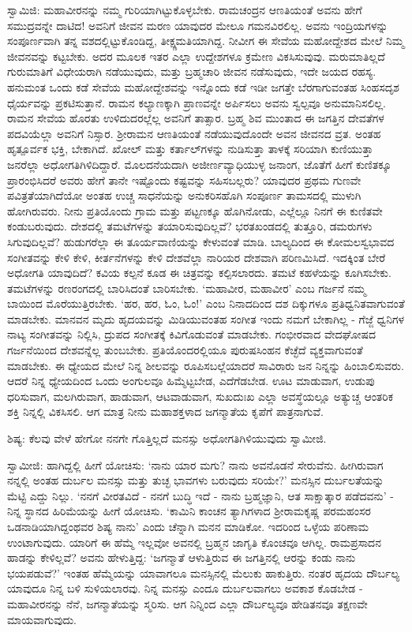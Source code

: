 ಸ್ವಾಮಿಜಿ: ಮಹಾವೀರನನ್ನು ನಮ್ಮ ಗುರಿಯಾಗಿಟ್ಟುಕೊಳ್ಳಬೇಕು. ರಾಮಚಂದ್ರನ ಆಣತಿಯಂತೆ ಅವನು ಹೇಗೆ ಸಮುದ್ರವನ್ನೇ ದಾಟಿದ! ಅವನಿಗೆ ಜೀವನ ಮರಣ ಯಾವುದರ ಮೇಲೂ ಗಮನವಿರಲಿಲ್ಲ. ಅವನು ಇಂದ್ರಿಯಗಳನ್ನು ಸಂಪೂರ್ಣವಾಗಿ ತನ್ನ ವಶದಲ್ಲಿಟ್ಟುಕೊಂಡಿದ್ದ, ತೀಕ್ಷ್ಣಮತಿಯಾಗಿದ್ದ. ನೀವೀಗ ಈ ಸೇವೆಯ ಮಹೋದ್ದೇಶದ ಮೇಲೆ ನಿಮ್ಮ ಜೀವನವನ್ನು ಕಟ್ಟಬೇಕು. ಅದರ ಮೂಲಕ ಇತರ ಎಲ್ಲಾ ಉದ್ದೇಶಗಳೂ ಕ್ರಮೇಣ ವಿಕಸಿಸುವುವು. ಮರುಮಾತಿಲ್ಲದೆ ಗುರುಮಾತಿಗೆ ವಿಧೇಯರಾಗಿ ನಡೆಯುವುದು, ಮತ್ತು ಬ್ರಹ್ಮಚಾರಿ ಜೀವನ ನಡೆಸುವುದು, ಇದೇ ಜಯದ ರಹಸ್ಯ. ಹನುಮಂತ ಒಂದು ಕಡೆ ಸೇವೆಯ ಮಹೋದ್ದೇಶವನ್ನು ಇನ್ನೊಂದು ಕಡೆ ಇಡೀ ಜಗತ್ತೇ ಬೆರಗಾಗುವಂತಹ ಸಿಂಹಸದೃಶ ಧೈರ್ಯವನ್ನು ಪ್ರಕಟಿಸುತ್ತಾನೆ. ರಾಮನ ಕಲ್ಯಾಣಕ್ಕಾಗಿ ಪ್ರಾಣವನ್ನೇ ಅರ್ಪಿಸಲು ಅವನು ಸ್ವಲ್ಪವೂ ಅನುಮಾನಿಸಲಿಲ್ಲ. ರಾಮನ ಸೇವೆಯ ಹೊರತು ಉಳಿದುದರಲ್ಲೆಲ್ಲ ಅವನಿಗೆ ತಾತ್ಸಾರ. ಬ್ರಹ್ಮ ಶಿವ ಮುಂತಾದ ಈ ಜಗತ್ತಿನ ದೇವತೆಗಳ ಪದವಿಯೆಲ್ಲಾ ಅವನಿಗೆ ನಿಸ್ಸಾರ. ಶ‍್ರೀರಾಮನ ಆಣತಿಯಂತೆ ನಡೆಯುವುದೊಂದೇ ಅವನ ಜೀವನದ ವ್ರತ. ಅಂತಹ ಹೃತ್ಪೂರ್ವಕ ಭಕ್ತಿ, ಬೇಕಾಗಿದೆ. ಖೋಲ್ ಮತ್ತು ಕರ್ತಾಲ್‌ಗಳನ್ನು ನುಡಿಸುತ್ತಾ ತಾಳಕ್ಕೆ ಸರಿಯಾಗಿ ಕುಣಿಯುತ್ತಾ ಜನರೆಲ್ಲಾ ಅಧೋಗತಿಗಿಳಿದಿದ್ದಾರೆ. ಮೊಲದನೆಯದಾಗಿ ಅಜೀರ್ಣವ್ಯಾಧಿಯುಳ್ಳ ಜನಾಂಗ, ಜೊತೆಗೆ ಹೀಗೆ ಕುಣಿತಕ್ಕೂ ಪ್ರಾರಂಭಿಸಿದರೆ ಅವರು ಹೇಗೆ ತಾನೇ ಇಷ್ಟೊಂದು ಕಷ್ಟವನ್ನು ಸಹಿಸಬಲ್ಲರು? ಯಾವುದರ ಪ್ರಥಮ ಗುಣವೇ ಪವಿತ್ರತೆಯಾಗಿದೆಯೋ ಅಂತಹ ಉಚ್ಚ ಸಾಧನೆಯನ್ನು ಅನುಕರಿಸಹೊಗಿ ಸಂಪೂರ್ಣ ತಾಮಸದಲ್ಲಿ ಮುಳುಗಿ ಹೋಗಿರುವರು. ನೀನು ಪ್ರತಿಯೊಂದು ಗ್ರಾಮ ಮತ್ತು ಪಟ್ಟಣಕ್ಕೂ ಹೊಗಿನೋಡು, ಎಲ್ಲೆಲ್ಲೂ ನಿನಗೆ ಈ ಕುಣಿತವೇ ಕಂಡುಬರುವುದು. ದೇಶದಲ್ಲಿ ತಮಟೆಗಳನ್ನು ತಯಾರಿಸುವುದಿಲ್ಲವೆ? ಭರತಖಂಡದಲ್ಲಿ ತುತ್ತೂರಿ, ಡಮರುಗಳು ಸಿಗುವುದಿಲ್ಲವೆ? ಹುಡುಗರೆಲ್ಲಾ ಈ ತೂರ್ಯವಾಣಿಯನ್ನು ಕೇಳುವಂತೆ ಮಾಡಿ. ಬಾಲ್ಯದಿಂದ ಈ ಕೋಮಲಸ್ವಭಾವದ ಸಂಗೀತವನ್ನು ಕೇಳಿ ಕೇಳಿ, ಕೀರ್ತನೆಗಳನ್ನು ಕೇಳಿ ದೇಶವೆಲ್ಲಾ ನಾರಿಯರ ದೇಶವಾಗಿ ಪರಿಣಮಿಸಿದೆ. ಇದಕ್ಕಿಂತ ಬೇರೆ ಅಧೋಗತಿ ಯಾವುದಿದೆ? ಕವಿಯ ಕಲ್ಪನೆ ಕೂಡ ಈ ಚಿತ್ರವನ್ನು ಕಲ್ಪಿಸಲಾರದು. ತಮಟೆ ಕಹಳೆಯನ್ನು ಕೂಗಿಸಬೇಕು. ತಮಟೆಗಳನ್ನು ರಣರಂಗದಲ್ಲಿ ಬಾರಿಸಿದಂತೆ ಬಾರಿಸಬೇಕು. ‘ಮಹಾವೀರ, ಮಹಾವೀರ’ ಎಂಬ ಗರ್ಜನೆ ನಮ್ಮ ಬಾಯಿಂದ ಮೊರೆಯುತ್ತಿರಬೇಕು. ‘ಹರ, ಹರ, ಓಂ, ಓಂ!’ ಎಂಬ ನಿನಾದದಿಂದ ದಶ ದಿಕ್ಕುಗಳೂ ಪ್ರತಿಧ್ವನಿತವಾಗುವಂತೆ ಮಾಡಬೇಕು. ಮಾನವನ ಮೃದು ಹೃದಯವನ್ನು ಮಿಡಿಯುವಂತಹ ಸಂಗೀತ ಇಂದು ನಮಗೆ ಬೇಕಾಗಿಲ್ಲ - ಗೆಜ್ಜೆ ಧ್ವನಿಗಳ ನಾಟ್ಯ ಸಂಗೀತವನ್ನು ನಿಲ್ಲಿಸಿ, ದ್ರುಪದ ಸಂಗೀತಕ್ಕೆ ಕಿವಿಗೊಡುವಂತೆ ಮಾಡಬೇಕು. ಗಂಭೀರವಾದ ವೇದಘೋಷದ ಗರ್ಜನೆಯಿಂದ ದೇಶವನ್ನೆಲ್ಲ ತುಂಬಬೇಕು. ಪ್ರತಿಯೊಂದರಲ್ಲಿಯೂ ಪುರುಷಸಿಂಹನ ಕೆಚ್ಛೆದೆ ವ್ಯಕ್ತವಾಗುವಂತೆ ಮಾಡಬೇಕು. ಈ ಧ್ಯೇಯದ ಮೇಲೆ ನಿನ್ನ ಶೀಲವನ್ನು ರೂಪಿಸಬಲ್ಲೆಯಾದರೆ ಸಾವಿರಾರು ಜನ ನಿನ್ನನ್ನು ಹಿಂಬಾಲಿಸುವರು. ಆದರೆ ನಿನ್ನ ಧ್ಯೇಯದಿಂದ ಒಂದು ಅಂಗುಲವೂ ಹಿಮ್ಮೆಟ್ಟಬೇಡ, ಎದೆಗೆಡಬೇಡ. ಊಟ ಮಾಡುವಾಗ, ಉಡುಪು ಧರಿಸುವಾಗ, ಮಲಗಿರುವಾಗ, ಹಾಡುವಾಗ, ಆಟವಾಡುವಾಗ, ಸುಖದುಃಖ ಎಲ್ಲಾ ಅವಸ್ಥೆಯಲ್ಲೂ ಅತ್ಯುಚ್ಚ ಆಂತರಿಕ ಶಕ್ತಿ ನಿನ್ನಲ್ಲಿ ವಿಕಸಿಸಲಿ. ಆಗ ಮಾತ್ರ ನೀನು ಮಹಾಶಕ್ತಳಾದ ಜಗನ್ಮಾತೆಯ ಕೃಪೆಗೆ ಪಾತ್ರನಾಗುವೆ.

ಶಿಷ್ಯ: ಕೆಲವು ವೇಳೆ ಹೇಗೋ ನನಗೇ ಗೊತ್ತಿಲ್ಲದೆ ಮನಸ್ಸು ಅಧೋಗತಿಗಿಳಿಯುವುದು ಸ್ವಾಮೀಜಿ.

ಸ್ವಾಮೀಜಿ: ಹಾಗಿದ್ದಲ್ಲಿ ಹೀಗೆ ಯೋಚಿಸು: ‘ನಾನು ಯಾರ ಮಗು? ನಾನು ಅವನೊಡನೆ ಸೇರುವೆನು. ಹೀಗಿರುವಾಗ ನನ್ನಲ್ಲಿ ಅಂತಹ ದುರ್ಬಲ ಮನಸ್ಸು ಮತ್ತು ತುಚ್ಛ ಭಾವಗಳು ಬರುವುದು ಸರಿಯೇ?’ ಮನಸ್ಸಿನ ದುರ್ಬಲತೆಯನ್ನು ಮೆಟ್ಟಿ ಎದ್ದು ನಿಲ್ಲು. ‘ನನಗೆ ವೀರತವಿದೆ - ನನಗೆ ಬುದ್ಧಿ ಇದೆ - ನಾನು ಬ್ರಹ್ಮಜ್ಞಾನಿ, ಆತ ಸಾಕ್ಷಾತ್ಕಾರ ಪಡೆದವನು’ - ನಿನ್ನ ಸ್ಥಾನದ ಹಿರಿಮೆಯನ್ನು ಹೀಗೆ ಯೋಚಿಸು. ‘ಕಾಮಿನಿ ಕಾಂಚನ ತ್ಯಾಗಿಗಳಾದ ಶ‍್ರೀರಾಮಕೃಷ್ಣ ಪರಮಹಂಸರ ಒಡನಾಡಿಯಾಗಿದ್ದಂಥವರ ಶಿಷ್ಯ ನಾನು’ ಎಂದು ಚೆನ್ನಾಗಿ ಮನನ ಮಾಡಿಕೋ. ಇದರಿಂದ ಒಳ್ಳೆಯ ಪರಿಣಾಮ ಉಂಟಾಗುವುದು. ಯಾರಿಗೆ ಈ ಹೆಮ್ಮೆ ಇಲ್ಲವೋ ಅವನಲ್ಲಿ ಬ್ರಹ್ಮನ ಜಾಗೃತಿ ಕೊಂಚವೂ ಆಗಿಲ್ಲ. ರಾಮಪ್ರಸಾದನ ಹಾಡನ್ನು ಕೇಳಿಲ್ಲವೆ? ಅವನು ಹೇಳುತ್ತಿದ್ದ: ‘ಜಗನ್ಮಾತೆ ಆಳುತ್ತಿರುವ ಈ ಜಗತ್ತಿನಲ್ಲಿ ಆರನ್ನು ಕಂಡು ನಾನು ಭಯಪಡುವೆ?’ ಇಂತಹ ಹೆಮ್ಮೆಯನ್ನು ಯಾವಾಗಲೂ ಮನಸ್ಸಿನಲ್ಲಿ ಮೆಲುಕು ಹಾಕುತ್ತಿರು. ನಂತರ ಹೃದಯ ದೌರ್ಬಲ್ಯ ಯಾವುದೂ ನಿನ್ನ ಬಳಿ ಸುಳಿಯಲಾರವು. ನಿನ್ನ ಮನಸ್ಸು ಎಂದೂ ದುರ್ಬಲವಾಗಲು ಅವಕಾಶ ಕೊಡಬೇಡ - ಮಹಾವೀರನನ್ನು ನೆನೆ, ಜಗನ್ಮಾತೆಯನ್ನು ಸ್ಮರಿಸು. ಆಗ ನಿನ್ನಿಂದ ಎಲ್ಲಾ ದೌರ್ಬಲ್ಯವೂ ಹೇಡಿತನವೂ ತಕ್ಷಣವೇ ಮಾಯವಾಗುವುದು.

